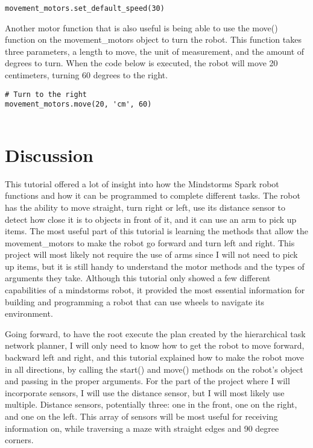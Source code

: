 \documentclass[10pt,twocolumn]{article}
\begin{document}
\begin{verbatim}
movement_motors.set_default_speed(30)
\end{verbatim}
    
Another motor function that is also useful is being able to use the move() function on the movement\_motors object to turn the robot. This function takes three parameters, a length to move, the unit of measurement, and the amount of degrees to turn. When the code below is executed, the robot will move 20 centimeters, turning 60 degrees to the right.

\begin{verbatim}
# Turn to the right
movement_motors.move(20, 'cm', 60)
    
\end{verbatim}
    

\section{Discussion}
This tutorial offered a lot of insight into how the Mindstorms Spark robot functions and how it can be programmed to complete different tasks. The robot has the ability to move straight, turn right or left, use its distance sensor to detect how close it is to objects in front of it, and it can use an arm to pick up items. The most useful part of this tutorial is learning the methods that allow the movement\_motors to make the robot go forward and turn left and right.   This project will most likely not require the use of arms since I will not need  to pick up items,  but it is still handy to understand the motor methods and the types of arguments they take. Although this tutorial only showed a few different capabilities of a mindstorms robot, it provided the most essential information for building and programming a robot that can use wheels to navigate its environment. 

Going forward, to have the root execute the plan created by the hierarchical task network planner, I will only need to know how to get the robot to move forward, backward left and right, and this tutorial explained how to make the robot move in all directions, by calling the start() and move() methods on the robot’s object and passing in the proper arguments. For the part of the project where I will incorporate sensors, I will use the distance sensor, but I will most likely use multiple. Distance sensors, potentially three: one in the front, one on the right, and one on the left. This array of sensors will be most useful for receiving information on, while traversing a maze with straight edges and 90 degree corners. 
\end{document}
